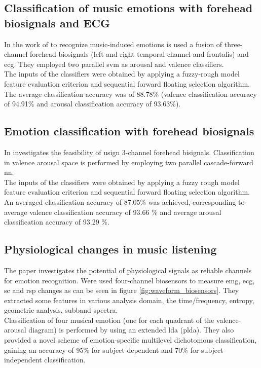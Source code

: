 \subsection{Classification of music emotions with  forehead biosignals and ECG}
In the work of \cite{naji2014classification} to recognize music-induced emotions is used a fusion of three-channel forehead biosignals (left and right temporal channel and frontalis) and \gls{ecg}. They employed two parallel \gls{svm} as arousal and valence classifiers.
\\ \indent
The inputs of the classifiers were obtained by applying a fuzzy-rough model feature evaluation criterion and sequential forward floating selection algorithm.
\\
The average classification accuracy was of 88.78\% (valence classification accuracy of 94.91\% and arousal classification accuracy of 93.63\%).

\subsection{Emotion classification with forehead biosignals}
In \cite{naji2015emotion} investigates the feasibility of usign 3-channel forehead bisignals. Classification in valence arousal space is performed by employing two parallel cascade-forward \gls{nn}.
\\
The inputs of the classifiers were obtained by applying a fuzzy rough model feature evaluation criterion and sequential forward floating selection algorithm. An averaged classification accuracy of 87.05\% was achieved, corresponding to average valence classification accuracy of 93.66 \% and average arousal classification accuracy of 93.29 \%.

\subsection{Physiological changes in music listening}
The paper \cite{kim2008emotion} investigates the potential of physiological signals as reliable channels for emotion recognition. Were used four-channel biosensors to measure \gls{emg}, \gls{ecg}, \gls{sc} and \gls{rsp} changes as can be seen in figure \ref{fig:waveform_biosensors}. They extracted some features in various analysis domain, the time/frequency, entropy, geometric analysis, subband spectra.
\\ \indent
Classification of four musical emotion (one for each quadrant of the valence-arousal diagram) is performed by using an extended \gls{lda} (p\gls{lda}). They also provided a novel scheme of emotion-specific multilevel dichotomous classification, gaining an accuracy of 95\% for subject-dependent and 70\% for subject-independent classification.
 
